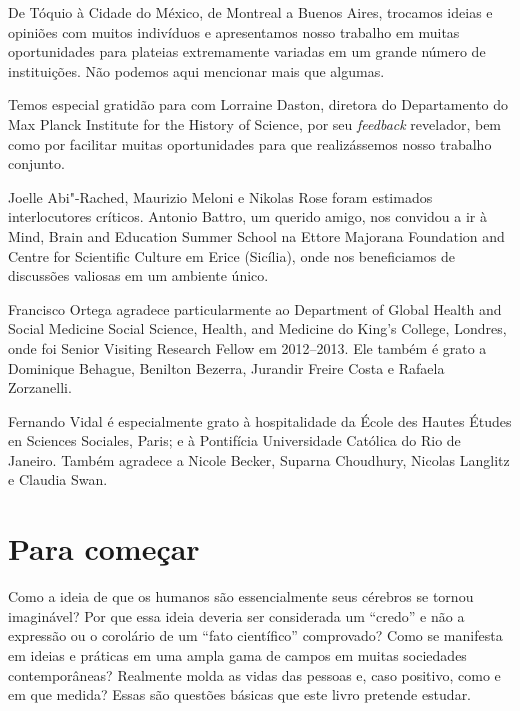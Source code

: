 De Tóquio à Cidade do México, de Montreal a Buenos Aires, trocamos
ideias e opiniões com muitos indivíduos e apresentamos nosso trabalho em
muitas oportunidades para plateias extremamente variadas em um grande
número de instituições. Não podemos aqui mencionar mais que algumas.

Temos especial gratidão para com Lorraine Daston, diretora do
Departamento  do Max Planck Institute for the History of Science, por
seu \emph{feedback} revelador, bem como por facilitar muitas
oportunidades para que realizássemos nosso trabalho conjunto.

Joelle Abi"-Rached, Maurizio Meloni e Nikolas Rose foram estimados
interlocutores críticos. Antonio Battro, um querido amigo, nos convidou
a ir à Mind, Brain and Education Summer School na Ettore Majorana
Foundation and Centre for Scientific Culture em Erice (Sicília), onde
nos beneficiamos de discussões valiosas em um ambiente único.

Francisco Ortega agradece particularmente ao Department of Global Health
and Social Medicine Social Science, Health, and Medicine do King's
College, Londres, onde foi Senior Visiting Research Fellow em
2012--2013. Ele também é grato a Dominique Behague, Benilton Bezerra,
Jurandir Freire Costa e Rafaela Zorzanelli.

Fernando Vidal é especialmente grato à hospitalidade da École des Hautes
Études en Sciences Sociales, Paris; e à Pontifícia Universidade Católica
do Rio de Janeiro. Também agradece a Nicole Becker, Suparna Choudhury,
Nicolas Langlitz e Claudia Swan.

\chapter{Para começar}

Como a ideia de que os humanos são essencialmente seus cérebros se
tornou imaginável? Por que essa ideia deveria ser considerada um
``credo'' e não a expressão ou o corolário de um ``fato científico''
comprovado? Como se manifesta em ideias e práticas em uma ampla gama de
campos em muitas sociedades contemporâneas? Realmente molda as vidas das
pessoas e, caso positivo, como e em que medida? Essas são questões
básicas que este livro pretende estudar.

